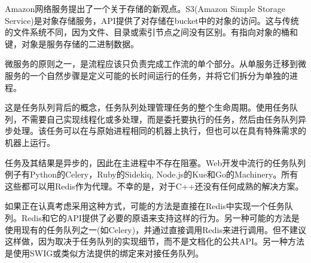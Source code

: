 Amazon网络服务提出了一个关于存储的新观点。S3(Amazon Simple Storage Service)是对象存储服务，API提供了对存储在bucket中的对象的访问。这与传统的文件系统不同，因为文件、目录或索引节点之间没有区别。有指向对象的桶和键，对象是服务存储的二进制数据。


微服务的原则之一，是流程应该只负责完成工作流的单个部分。从单服务迁移到微服务的一个自然步骤是定义可能的长时间运行的任务，并将它们拆分为单独的进程。

这是任务队列背后的概念，任务队列处理管理任务的整个生命周期。使用任务队列，不需要自己实现线程化或多处理，而是委托要执行的任务，然后由任务队列异步处理。该任务可以在与原始进程相同的机器上执行，但也可以在具有特殊需求的机器上运行。

任务及其结果是异步的，因此在主进程中不存在阻塞。Web开发中流行的任务队列例子有Python的Celery，Ruby的Sidekiq, Node.js的Kue和Go的Machinery。所有这些都可以用Redis作为代理。不幸的是，对于C++还没有任何成熟的解决方案。

如果正在认真考虑采用这种方式，可能的方法是直接在Redis中实现一个任务队列。Redis和它的API提供了必要的原语来支持这样的行为。另一种可能的方法是使用现有的任务队列之一(如Celery)，并通过直接调用Redis来进行调用。但不建议这样做，因为取决于任务队列的实现细节，而不是文档化的公共API。另一种方法是使用SWIG或类似方法提供的绑定来对接任务队列。



















